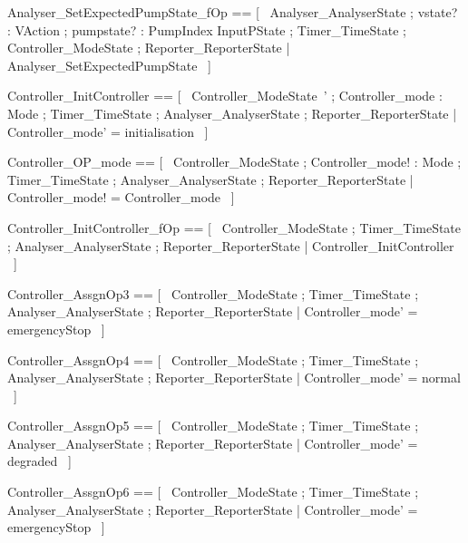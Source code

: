 \documentclass{article}
\begin{document}
\begin{zed}
	Analyser\_SetExpectedPumpState\_fOp == [~  \Xi Analyser\_AnalyserState ; vstate? : VAction ; pumpstate? : PumpIndex \fun InputPState ; \Xi Timer\_TimeState ; \Xi Controller\_ModeState ; \Xi Reporter\_ReporterState | \lnot \pre Analyser\_SetExpectedPumpState  ~]
\end{zed}

\begin{zed}
	Controller\_InitController == [~  Controller\_ModeState~' ; Controller\_mode : Mode ; \Xi Timer\_TimeState ; \Xi Analyser\_AnalyserState ; \Xi Reporter\_ReporterState | Controller\_mode' = initialisation  ~]
\end{zed}

\begin{zed}
	Controller\_OP\_mode == [~  \Xi Controller\_ModeState ; Controller\_mode! : Mode ; \Xi Timer\_TimeState ; \Xi Analyser\_AnalyserState ; \Xi Reporter\_ReporterState | Controller\_mode! = Controller\_mode  ~]
\end{zed}

\begin{zed}
	Controller\_InitController\_fOp == [~  \Xi Controller\_ModeState ; \Xi Timer\_TimeState ; \Xi Analyser\_AnalyserState ; \Xi Reporter\_ReporterState | \lnot \pre Controller\_InitController  ~]
\end{zed}

\begin{zed}
	Controller\_AssgnOp3 == [~  \Delta Controller\_ModeState ; \Xi Timer\_TimeState ; \Xi Analyser\_AnalyserState ; \Xi Reporter\_ReporterState | Controller\_mode' = emergencyStop  ~]
\end{zed}

\begin{zed}
	Controller\_AssgnOp4 == [~  \Delta Controller\_ModeState ; \Xi Timer\_TimeState ; \Xi Analyser\_AnalyserState ; \Xi Reporter\_ReporterState | Controller\_mode' = normal  ~]
\end{zed}

\begin{zed}
	Controller\_AssgnOp5 == [~  \Delta Controller\_ModeState ; \Xi Timer\_TimeState ; \Xi Analyser\_AnalyserState ; \Xi Reporter\_ReporterState | Controller\_mode' = degraded  ~]
\end{zed}

\begin{zed}
	Controller\_AssgnOp6 == [~  \Delta Controller\_ModeState ; \Xi Timer\_TimeState ; \Xi Analyser\_AnalyserState ; \Xi Reporter\_ReporterState | Controller\_mode' = emergencyStop  ~]
\end{zed}
\end{document}
